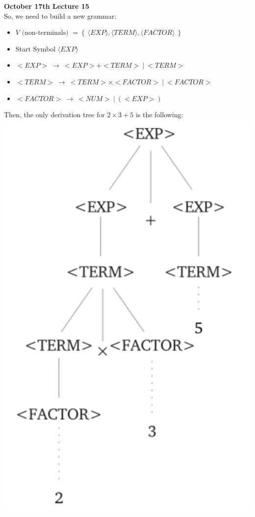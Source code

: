 \documentclass[11pt]{article}
\newcommand{\curbrak}[1]{\left\{ #1 \right\}}
\newcommand{\lrangle}[1]{\langle #1 \rangle}
\begin{document}
\textbf{October 17th Lecture 15}\\
So, we need to build a new grammar:	
\begin{itemize}
	\item $V\text{ (non-terminals) } = \curbrak{\ \lrangle{EXP}, \lrangle{TERM}, \lrangle{FACTOR}\ }$
	\item Start Symbol $\lrangle{EXP}$
	\item $<EXP>\ \to\  <EXP>+<TERM>\ | \ <TERM>$
	\item $<TERM>\ \to \ <TERM>\times <FACTOR>\ |\ <FACTOR> $
	\item $<FACTOR>\ \to \ <NUM>\ |\ (<EXP>)$
\end{itemize}
Then, the only derivation tree for $2\times 3+5$ is the following:\\
\includegraphics[scale = 0.5]{images/3}
\end{document}
